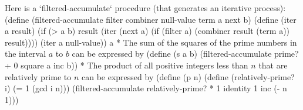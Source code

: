 Here is a `filtered-accumulate` procedure (that generates an iterative process):
\begtt\scm
(define (filtered-accumulate filter combiner null-value term a next b)
  (define (iter a result)
    (if (> a b)
        result
        (iter (next a)
              (if (filter a)
                  (combiner result (term a))
                  result))))
  (iter a null-value))
\endtt
\begitems\novspaces\style a
* The sum of the squares of the prime numbers in the interval $a$ to $b$ can be expressed by
\begtt\scm
(define (s a b)
  (filtered-accumulate prime? + 0 square a inc b))
\endtt
* The product of all positive integers less than $n$ that are relatively prime to $n$ can be expressed by
\begtt\scm
(define (p n)
  (define (relatively-prime? i)
    (= 1 (gcd i n)))
  (filtered-accumulate relatively-prime? * 1 identity 1 inc (- n 1)))
\endtt
\enditems
